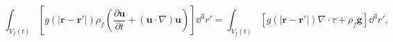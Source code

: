 \begin{equation}
\int_{V_f(t)}{\left[g(|\mathbf{r} - \mathbf{r'}|) \rho_f \left(\frac{\partial
\mathbf{u}}{\partial t} + ( \mathbf{u} \cdot \nabla) \mathbf{u} \right) \right]
\dd^3 r'} = 
\int_{V_f(t)}{\left[g(|\mathbf{r} - \mathbf{r'}|) \nabla \cdot \tau +
\rho_f \mathbf{g} \right] \dd^3 r'} ,
 \label{eq:nsmomentumequation}
\end{equation}
